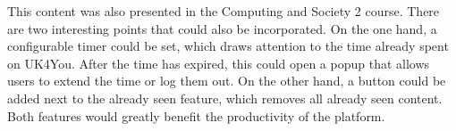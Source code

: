 This content was also presented in the Computing and Society 2 course.
There are two interesting points that could also be incorporated.
On the one hand, a configurable timer could be set, which draws attention to the time already spent on UK4You.
After the time has expired, this could open a popup that allows users to extend the time or log them out.
On the other hand, a button could be added next to the already seen feature, which removes all already seen content.
Both features would greatly benefit the productivity of the platform.
